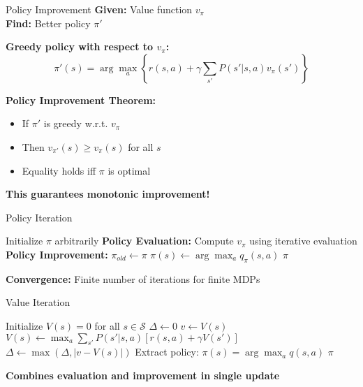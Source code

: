 \documentclass[aspectratio=169,10pt]{beamer}
\begin{document}
\begin{frame}{Policy Improvement}
\textbf{Given:} Value function $v_\pi$ \\
\textbf{Find:} Better policy $\pi'$

\textbf{Greedy policy with respect to $v_\pi$:}
\begin{equation}
\pi'(s) = \arg\max_a \left\{ r(s,a) + \gamma \sum_{s'} P(s'|s,a) v_\pi(s') \right\}
\end{equation}

\textbf{Policy Improvement Theorem:}
\begin{itemize}
    \item If $\pi'$ is greedy w.r.t. $v_\pi$
    \item Then $v_{\pi'}(s) \geq v_\pi(s)$ for all $s$
    \item Equality holds iff $\pi$ is optimal
\end{itemize}

\textbf{This guarantees monotonic improvement!}
\end{frame}

\begin{frame}{Policy Iteration}
\begin{algorithm}[H]
\caption{Policy Iteration}
\begin{algorithmic}[1]
\STATE Initialize $\pi$ arbitrarily
\REPEAT
    \STATE \textbf{Policy Evaluation:}
    \STATE \quad Compute $v_\pi$ using iterative evaluation
    \STATE \textbf{Policy Improvement:}
    \STATE \quad $\pi_{old} \leftarrow \pi$
        \STATE $\pi(s) \leftarrow \arg\max_a q_\pi(s,a)$
    \ENDFOR
{}
\RETURN $\pi$
\end{algorithmic}
\end{algorithm}

\textbf{Convergence:} Finite number of iterations for finite MDPs
\end{frame}

\begin{frame}{Value Iteration}
\begin{algorithm}[H]
\caption{Value Iteration}
\begin{algorithmic}[1]
\STATE Initialize $V(s) = 0$ for all $s \in \mathcal{S}$
\REPEAT
    \STATE $\Delta \leftarrow 0$
        \STATE $v \leftarrow V(s)$
        \STATE $V(s) \leftarrow \max_a \sum_{s'} P(s'|s,a)[r(s,a) + \gamma V(s')]$
        \STATE $\Delta \leftarrow \max(\Delta, |v - V(s)|)$
    \ENDFOR
\UNTIL{$\Delta < \epsilon$}
\STATE Extract policy: $\pi(s) = \arg\max_a q(s,a)$
\RETURN $\pi$
\end{algorithmic}
\end{algorithm}

\textbf{Combines evaluation and improvement in single update}
\end{frame}
\end{document}
